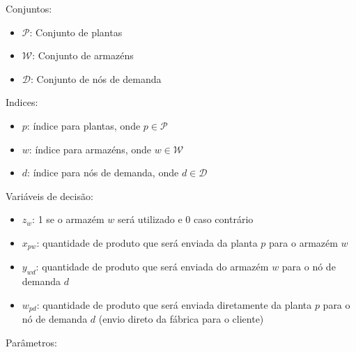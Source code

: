 \documentclass[12pt,a4paper]{article}
\begin{document}
Conjuntos:

\begin{itemize}
    \item $\mathcal{P}$: Conjunto de plantas
    \item $\mathcal{W}$: Conjunto de armazéns
    \item $\mathcal{D}$: Conjunto de nós de demanda
\end{itemize}

Indices:

\begin{itemize}
    \item $p$: índice para plantas, onde $p \in \mathcal{P}$
    \item $w$: índice para armazéns, onde $w \in \mathcal{W}$
    \item $d$: índice para nós de demanda, onde $d \in \mathcal{D}$
\end{itemize}


Variáveis de decisão:

\begin{itemize}
    \item $z_{w}$: 1 se o armazém $w$ será utilizado e 0 caso contrário
    \item $x_{pw}$: quantidade de produto que será enviada da planta $p$ para o armazém $w$
    \item $y_{wd}$: quantidade de produto que será enviada do armazém $w$ para o nó de demanda $d$
    \item $w_{pd}$: quantidade de produto que será enviada diretamente da planta $p$ para o nó de demanda $d$ (envio direto da fábrica para o cliente)
\end{itemize}

Parâmetros:
\end{document}
